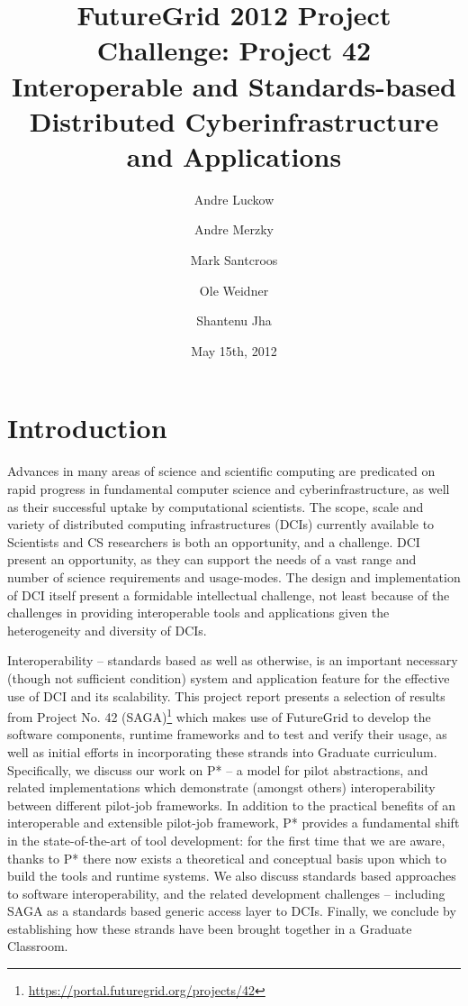 \documentclass[]{paper}
\begin{document}
\title{FutureGrid 2012 Project Challenge: Project 42 \\
  Interoperable and Standards-based Distributed Cyberinfrastructure
  and Applications}
 
\author{Andre Luckow 
  \and Andre Merzky
  \and Mark Santcroos
  \and Ole Weidner 
  \and Shantenu Jha
}
\date{May 15th, 2012}
\maketitle


\section{Introduction}

Advances in many areas of science and scientific computing are
predicated on rapid progress in fundamental computer science and
cyberinfrastructure, as well as their successful uptake by
computational scientists. The scope, scale and variety of distributed
computing infrastructures (DCIs) currently available to Scientists and
CS researchers is both an opportunity, and a challenge. DCI present an
opportunity, as they can support the needs of a vast range and number
of science requirements and usage-modes. The design and implementation
of DCI itself present a formidable intellectual challenge, not least
because of the challenges in providing interoperable tools and
applications given the heterogeneity and diversity of DCIs.


Interoperability -- standards based as well as otherwise, is an
important necessary (though not sufficient condition) system and
application feature for the effective use of DCI and its
scalability. This project report presents a selection of results from
Project No. 42
(SAGA)\footnote{\url{https://portal.futuregrid.org/projects/42}} which
makes use of FutureGrid to develop the software components, runtime
frameworks and to test and verify their usage, as well as initial
efforts in incorporating these strands into Graduate curriculum.
Specifically, we discuss our work on P* -- a model for pilot
abstractions, and related implementations which demonstrate (amongst
others) interoperability between different pilot-job frameworks. In
addition to the practical benefits of an interoperable and extensible
pilot-job framework, P* provides a fundamental shift in the
state-of-the-art of tool development: for the first time that we are
aware, thanks to P* there now exists a theoretical and conceptual
basis upon which to build the tools and runtime systems.  We also
discuss standards based approaches to software interoperability, and
the related development challenges -- including SAGA as a standards
based generic access layer to DCIs.  Finally, we conclude by
establishing how these strands have been brought together in a
Graduate Classroom.
\end{document}
